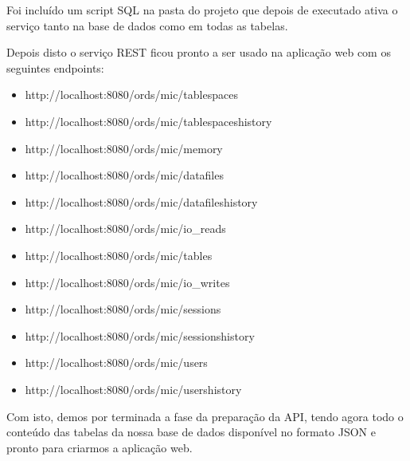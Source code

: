 Foi incluído um script SQL na pasta do projeto que depois de executado ativa o serviço tanto na base de dados como em todas as tabelas.

Depois disto o serviço REST ficou pronto a ser usado na aplicação web com os seguintes endpoints:
\begin{itemize}
    \item http://localhost:8080/ords/mic/tablespaces
    \item http://localhost:8080/ords/mic/tablespaceshistory
    \item http://localhost:8080/ords/mic/memory
    \item http://localhost:8080/ords/mic/datafiles
    \item http://localhost:8080/ords/mic/datafileshistory
    \item http://localhost:8080/ords/mic/io\_reads
    \item http://localhost:8080/ords/mic/tables
    \item http://localhost:8080/ords/mic/io\_writes
    \item http://localhost:8080/ords/mic/sessions
    \item http://localhost:8080/ords/mic/sessionshistory
    \item http://localhost:8080/ords/mic/users
    \item http://localhost:8080/ords/mic/usershistory
\end{itemize}

Com isto, demos por terminada a fase da preparação da API, tendo agora todo o conteúdo das tabelas da nossa base de dados disponível no formato JSON e pronto para criarmos a aplicação web.